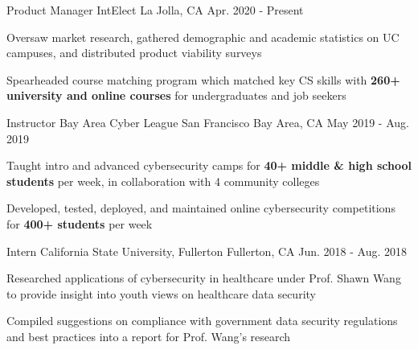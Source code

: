 

\begin{cventries}

  \cventry
    {Product Manager} %
    {IntElect} %
    {La Jolla, CA} %
    {Apr. 2020 - Present} %
    {
      \begin{cvitems} %
        \item {Oversaw market research, gathered demographic and academic statistics on UC campuses, and distributed product viability surveys}
        \item {Spearheaded course matching program which matched key CS skills with \textbf{260+ university and online courses} for undergraduates and job seekers}
      \end{cvitems}
    }

  \cventry
    {Instructor} %
    {Bay Area Cyber League} %
    {San Francisco Bay Area, CA} %
    {May 2019 - Aug. 2019} %
    {
      \begin{cvitems} %
        \item {Taught intro and advanced cybersecurity camps for \textbf{40+ middle \& high school students} per week, in collaboration with 4 community colleges}
        \item {Developed, tested, deployed, and maintained online cybersecurity competitions for \textbf{400+ students} per week}
      \end{cvitems}
    }

  \cventry
    {Intern} %
    {California State University, Fullerton} %
    {Fullerton, CA} %
    {Jun. 2018 - Aug. 2018} %
    {
      \begin{cvitems} %
        \item {Researched applications of cybersecurity in healthcare under Prof. Shawn Wang to provide insight into youth views on healthcare data security}
        \item {Compiled suggestions on compliance with government data security regulations and best practices into a report for Prof. Wang's research}
      \end{cvitems}
    }

\end{cventries}
